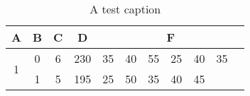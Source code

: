 
% 

\begin{table}[htbp]
\centering
\begin{tabular}{|c|c|c|c|p{1cm}p{1cm}p{1cm}p{1cm}p{1cm}p{1cm}p{1cm}|}
\hline
A & B & C & D & \multicolumn{7}{|c|}{F}  \\ \hline
\multirow{ 2}{*}{1} & 0 & 6 & 230 & 35 & 40 & 55 & 25 & 40 & 35 & \\
                    & 1 & 5 & 195 & 25 & 50 & 35 & 40 & 45 &  &  \\ \hline
\end{tabular}
\caption{A test caption}
\label{table2}
\end{table}

% 




                               

